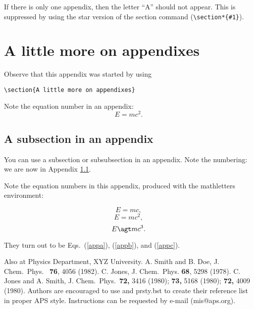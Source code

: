  If there is only
one appendix, then the letter ``A'' should not appear. This is suppressed by
using the star version of the section command (\verb+\section*{#1}+).


\section{A little more on appendixes}

Observe that this appendix was started by using
\begin{verbatim}
\section{A little more on appendixes}
\end{verbatim}

Note the equation number in an appendix:
\begin{equation} E=mc^2. \end{equation}

\subsection{A subsection in an appendix}
\label{app:subsec}

You can use a subsection or subsubsection in an
appendix. Note the numbering: we are now in Appendix \ref{app:subsec}.





Note the equation numbers in this appendix, produced
with the mathletters environment:
\begin{mathletters}
\begin{equation} E=mc, \label{appa}\end{equation}
\begin{equation} E=mc^2, \label{appb}\end{equation}
\begin{equation} E\agt mc^3. \label{appc}\end{equation}
\end{mathletters}
They turn out to be Eqs.\ (\ref{appa}), (\ref{appb}),
and (\ref{appc}).

\begin{references}
  Also at Physics Department, XYZ University.
A. Smith  and B. Doe, J. Chem.\  Phys.\ {\bf
76}, 4056 (1982).
C. Jones, J. Chem.\ Phys. {\bf 68}, 5298 (1978).
C. Jones and A. Smith,
J. Chem.\ Phys.\ {\bf 72,}
3416 (1980); {\bf 73,} 5168 (1980); {\bf72,} 4009 (1980).
 Authors are encouraged to use \BibTeX\/ and prsty.bst
to create their reference list in proper APS style. Instructions can
be requested by e-mail (mis@aps.org). 
\end{references}



